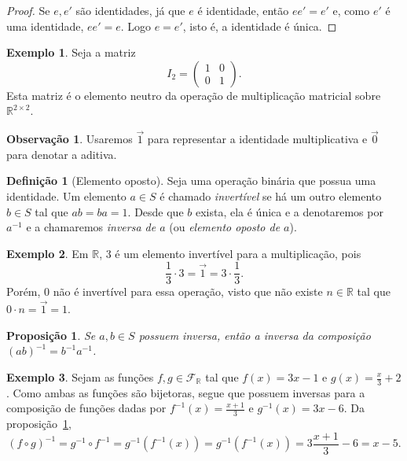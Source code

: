 \documentclass[a4paper,12pt]{article}
\theoremstyle{plain}
\newtheorem{proposicao}{Proposição}[section]
\theoremstyle{definition}
\newtheorem{definicao}{Definição}[section]
\newtheorem{observacao}{Observação}[section]
\newtheorem{exemplo}{Exemplo}[section]
\begin{document}
\begin{proof}
	Se \(e,e'\) são identidades, já que \(e\) é identidade, então \(ee' = e'\) e, como $e'$ é uma identidade, \(ee' = e\). Logo \(e = e'\), isto é, a identidade é única.
\end{proof}

\begin{exemplo}
	Seja a matriz 
	$$ I_2 =
	\begin{pmatrix}
		1&0\\
		0&1
	\end{pmatrix}.
	$$ 
	Esta matriz é o elemento neutro da operação de multiplicação matricial sobre $\mathbb{R}^{2\times 2}$.
\end{exemplo}

\begin{observacao}
	Usaremos $\vec{1}$ para representar a identidade multiplicativa e $\vec{0}$ para denotar a aditiva.
\end{observacao}

\begin{definicao}[Elemento oposto]
	Seja uma operação binária que possua uma identidade. Um elemento \(a\in S\) é chamado \emph{invertível} se há um outro elemento \(b\in S\) tal que \(ab = ba = 1\). Desde que \(b\) exista, ela é única e a denotaremos por \(a^{-1}\) e a chamaremos
	\emph{inversa de $a$} (ou \emph{elemento oposto de $a$}).
\end{definicao}

\begin{exemplo}
	Em $\mathbb{R}$, 3 é um elemento invertível para a multiplicação, pois
	$$\frac{1}{3}\cdot3 = \vec{1} =  3\cdot\frac{1}{3}.$$
	Porém, $0$ não é invertível para essa operação, visto que não existe $n\in\mathbb{R}$ tal que $0\cdot n = \vec{1} = 1$.
\end{exemplo}

\begin{proposicao}\label{prop:compinv}
	Se \(a,b\in S\) possuem inversa, então a inversa da composição \((ab)^{-1} = b^{-1}a^{-1}\).
\end{proposicao}

\begin{exemplo}
	Sejam as funções $f,g\in \mathcal{F}_\mathbb{R}$ tal que $f(x) = 3x-1$ e $g(x) = \frac x 3 + 2$. Como ambas as funções são bijetoras, segue que possuem inversas para a composição de funções dadas por $f^{-1}(x) = \frac{x+1}3$ e $g^{-1}(x) = 3x - 6$. Da proposição~\ref{prop:compinv}, $$(f\circ g)^{-1} = g^{-1}\circ f^{-1} = g^{-1}(f^{-1}(x)) = g^{-1}(f^{-1}(x)) = 3\frac{x + 1}3 - 6 = x - 5.$$
\end{exemplo}
\end{document}

